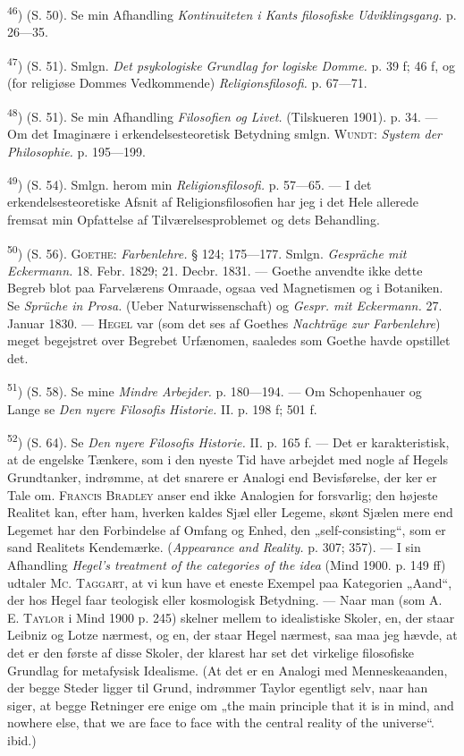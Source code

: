 \documentclass[12pt,a4paper,openany]{book}
\newcommand{\opage}[1]{\marginnote{\footnotesize\textit{[#1]}}}
\begin{document}
\begin{small}
\textsuperscript{46}) (S. 50). Se min Afhandling \textit{Kontinuiteten i Kants
filosofiske Udviklingsgang.} p. 26---35.

\textsuperscript{47}) (S. 51). Smlgn. \textit{Det psykologiske Grundlag for
logiske Domme.} p. 39 f; 46 f, og (for religiøse Dommes Vedkommende)
\textit{Religionsfilosofi.} p. 67---71.

\textsuperscript{48}) (S. 51). Se min Afhandling \textit{Filosofien og Livet.}
(Tilskueren 1901). p. 34. --- Om det Imaginære i erkendelsesteoretisk Betydning
smlgn. \textsc{Wundt}: \textit{System der Philosophie.} p. 195---199.

\textsuperscript{49}) (S. 54). Smlgn. herom min \textit{Religionsfilosofi.} p.
57---65. --- I det erkendelsesteoretiske Afsnit af Religionsfilosofien har jeg
i det Hele allerede fremsat min Opfattelse af Tilværelsesproblemet og dets
Behandling.

\textsuperscript{50}) (S. 56). \textsc{Goethe}: \textit{Farbenlehre.} § 124;
175---177. Smlgn. \textit{Gespräche mit Eckermann.} 18. Febr. 1829; 21. Decbr.
1831. --- Goethe anvendte ikke dette Begreb blot paa Farvelærens Omraade, ogsaa
ved Magnetismen og i Botaniken. Se \textit{Sprüche in Prosa.} (Ueber
Naturwissenschaft) og \textit{Gespr. mit Eckermann.} 27. Januar 1830. ---
\textsc{Hegel} var (som det ses af Goethes \textit{Nachträge zur Farbenlehre})
meget begejstret over Begrebet Urfænomen, saaledes som Goethe havde opstillet det.

\textsuperscript{51}) (S. 58). Se mine \textit{Mindre Arbejder.} p. 180---194.
--- Om Schopenhauer og Lange se \textit{Den nyere Filosofis Historie.} II. p.
198 f; 501 f.

\textsuperscript{52}) (S. 64). Se \textit{Den nyere Filosofis Historie.} II. p.
165 f. --- Det er karakteristisk, at de engelske Tænkere, som i den nyeste Tid
have arbejdet med
\opage{90}nogle af Hegels Grundtanker, indrømme, at det snarere er Analogi end
Bevisførelse, der ker er Tale om. \textsc{Francis Bradley} anser end ikke
Analogien for forsvarlig; den højeste Realitet kan, efter ham, hverken kaldes
Sjæl eller Legeme, skønt Sjælen mere end Legemet har den Forbindelse af Omfang
og Enhed, den „self-consisting“, som er sand Realitets Kendemærke.
(\textit{Appearance and Reality.} p. 307; 357). --- I sin Afhandling
\textit{Hegel's treatment of the categories of the idea} (Mind 1900. p. 149 ff)
udtaler\textsc{ Mc. Taggart,} at vi kun have et eneste Exempel paa Kategorien
„Aand“, der hos Hegel faar teologisk eller kosmologisk Betydning. --- Naar man
(som \textsc{A. E. Taylor} i Mind 1900 p. 245) skelner mellem to idealistiske
Skoler, en, der staar Leibniz og Lotze nærmest, og en, der staar Hegel nærmest,
saa maa jeg hævde, at det er den første af disse Skoler, der klarest har set
det virkelige filosofiske Grundlag for metafysisk Idealisme. (At det er en
Analogi med Menneskeaanden, der begge Steder ligger til Grund, indrømmer Taylor
egentligt selv, naar han siger, at begge Retninger ere enige om „the main
principle that it is in mind, and nowhere else, that we are face to face with
the central reality of the universe“. ibid.)


\end{small}
\end{document}
